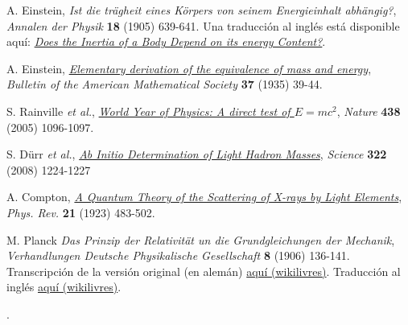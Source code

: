 \begin{thebibliography}{99}
 A. Einstein, \textit{Ist die tr\"agheit eines K\"orpers von seinem Energieinhalt abh\"angig?}, {\sl Annalen der Physik} {\bf 18} (1905) 639-641. Una traducción al inglés está disponible aquí: \href{{https://www.fourmilab.ch/etexts/einstein/E_mc2/e_mc2.pdf}}{\textit{Does the Inertia of a Body Depend on its energy Content?}}.

 A. Einstein, \href{http://www.ams.org/journals/bull/2000-37-01/S0273-0979-99-00805-8/S0273-0979-99-00805-8.pdf}
{\textit{Elementary derivation of the equivalence of mass and energy}}, {\sl Bulletin of the American Mathematical Society} {\bf 37} (1935) 39-44.

 S. Rainville \textit{et al.}, \href{http://www.nature.com/nature/journal/v438/n7071/full/4381096a.html}{\it World Year of Physics: A direct test of $E=mc^2$}, {\sl Nature} {\bf 438} (2005) 1096-1097.

 S. Dürr \textit{et al.}, \href{http://www.sciencemag.org/content/322/5905/1224.full}{\it Ab Initio Determination of Light Hadron Masses}, {\sl Science} {\bf 322} (2008) 1224-1227

 A. Compton, \href{http://prola.aps.org/abstract/PR/v21/i5/p483_1}{\it A Quantum Theory of the Scattering of X-rays by Light Elements}, {\sl Phys. Rev.} {\bf 21} (1923) 483-502.

 M. Planck {\it Das Prinzip der Relativit\"at un die Grundgleichungen der Mechanik}, {\sl Verhandlungen Deutsche Physikalische Gesellschaft} {\bf 8} (1906) 136-141. Transcripción de la versión original (en alemán) \href{http://wikilivres.ca/wiki/Das_Prinzip_der_Relativit\%C3\%A4t_und_die_Grundgleichungen_der_Mechanik}{aquí (wikilivres)}. Traducción al inglés  \href{http://en.wikisource.org/wiki/Translation:The_Principle_of_Relativity_and_the_Fundamental_Equations_of_Mechanics}{aquí (wikilivres)}.

\end{thebibliography}.

